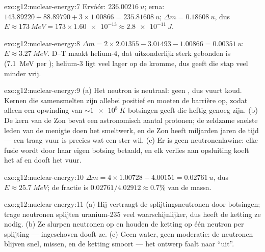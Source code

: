 \begin{solution}{exo:g12:nuclear-energy:7}
Ervóór: $\qty{236.00216}{u}$; erna: $143.89220 + 88.89790 +
3 \times 1.00866 = \qty{235.81608}{u}$; $\Delta m = \qty{0.18608}{u}$, dus
$E \approx \qty{173}{MeV} = 173 \times \num{1.60e-13} \approx
\qty{2.8e-11}{J}$.
\end{solution}

\begin{solution}{exo:g12:nuclear-energy:8}
$\Delta m = 2 \times 2.01355 - 3.01493 - 1.00866 = \qty{0.00351}{u}$:
$E \approx \qty{3.27}{MeV}$. D--T maakt helium-4, dat uitzonderlijk sterk
gebonden is (\qty{7.1}{MeV} per ); helium-3 ligt veel lager op de
kromme, dus geeft die stap veel minder vrij.
\end{solution}

\begin{solution}{exo:g12:nuclear-energy:9}
(a) Het neutron is neutraal: geen , dus vuurt 
koud. Kernen die samensmelten zijn allebei positief en moeten de barrière op,
zodat alleen een opwinding van $\sim \qty{1e8}{K}$ botsingen geeft die heftig
genoeg zijn. (b) De kern van de Zon bevat een astronomisch aantal protonen; de
zeldzame snelste leden van de menigte doen het smeltwerk, en de Zon heeft
miljarden jaren de tijd --- een traag vuur is precies wat een ster wil.
(c) Er is geen neutronenlawine: elke fusie wordt door haar eigen botsing
betaald, en elk verlies aan opsluiting koelt het  af en dooft het vuur.
\end{solution}

\begin{solution}{exo:g12:nuclear-energy:10}
$\Delta m = 4 \times 1.00728 - 4.00151 = \qty{0.02761}{u}$, dus
$E \approx \qty{25.7}{MeV}$; de fractie is $0.02761/4.02912 \approx 0.7\%$ van
de massa.
\end{solution}

\begin{solution}{exo:g12:nuclear-energy:11}
(a) Hij vertraagt de splijtingsneutronen door botsingen; trage neutronen
splijten uranium-235 veel waarschijnlijker, dus heeft de ketting ze nodig.
(b) Ze slurpen neutronen op en houden de ketting op één neutron per splijting
--- ingeschoven dooft ze. (c) Geen water, geen moderatie: de neutronen blijven
snel, missen, en de ketting smoort --- het ontwerp faalt naar ``uit''.
\end{solution}

